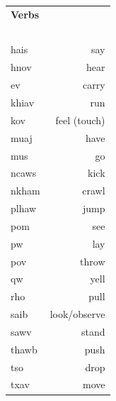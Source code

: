 \documentclass{article}
\begin{document}
\begin{multicols}{2}
\begin{tabular}{l r}
\textbf{Verbs} \\
~\\
hais &say\\
hnov &hear\\
ev &carry\\
khiav &run\\
kov &feel (touch)\\
muaj &have\\
mus &go\\
ncaws &kick\\
nkham &crawl\\
plhaw &jump\\
pom &see\\
pw &lay\\
pov &throw\\
qw &yell\\
rho &pull\\
saib &look/observe\\
sawv &stand\\
thawb &push\\
tso &drop\\
txav &move\\
\end{tabular}

\end{multicols}

\clearpage
\end{document}
